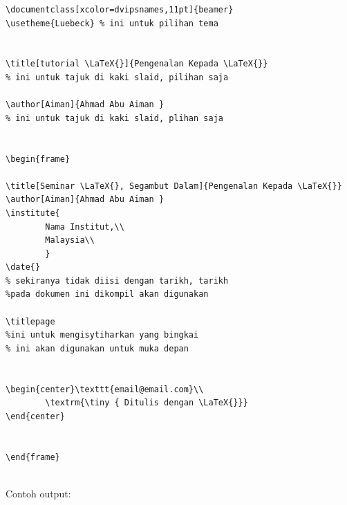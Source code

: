 \begin{Verbatim}[frame=single]
\documentclass[xcolor=dvipsnames,11pt]{beamer}
\usetheme{Luebeck} % ini untuk pilihan tema


\title[tutorial \LaTeX{}]{Pengenalan Kepada \LaTeX{}} 
% ini untuk tajuk di kaki slaid, pilihan saja

\author[Aiman]{Ahmad Abu Aiman }
% ini untuk tajuk di kaki slaid, plihan saja


\begin{frame}

\title[Seminar \LaTeX{}, Segambut Dalam]{Pengenalan Kepada \LaTeX{}}
\author[Aiman]{Ahmad Abu Aiman }
\institute{
        Nama Institut,\\
        Malaysia\\
        }
\date{} 
% sekiranya tidak diisi dengan tarikh, tarikh 
%pada dokumen ini dikompil akan digunakan

\titlepage 
%ini untuk mengisytiharkan yang bingkai
% ini akan digunakan untuk muka depan


\begin{center}\texttt{email@email.com}\\
        \textrm{\tiny { Ditulis dengan \LaTeX{}}}
\end{center}


\end{frame}


\end{Verbatim}

\begin{minipage}{\textwidth}
Contoh output:
\begin{center}
\end{center}
\end{minipage}
